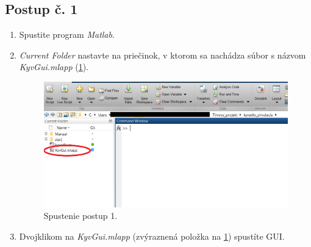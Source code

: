 \subsection{Postup č. 1}
\begin{enumerate}
	\item Spustite program \textit{Matlab}.
	\item \textit{Current Folder} nastavte na priečinok, v ktorom sa nachádza súbor s názvom \textit{KyvGui.mlapp} (\cref{fig:spustenie}). 
	\begin{figure}[h!]
		\centering
		\includegraphics[width=0.9\linewidth]{spustenie1}
		\caption{Spustenie postup 1.}
		\label{fig:spustenie}
	\end{figure}
	\item Dvojklikom na \textit{KyvGui.mlapp} (zvýraznená položka na \cref{fig:spustenie}) spustíte GUI.
	
\end{enumerate}

